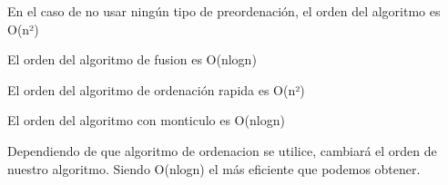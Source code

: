 En el caso de no usar ningún tipo de preordenación, el orden del algoritmo es O(n²)

El orden del algoritmo de fusion es O(nlogn)

El orden del algoritmo de ordenación rapida es O(n²)

El orden del algoritmo con monticulo es O(nlogn)

Dependiendo de que algoritmo de ordenacion se utilice, cambiará el orden de nuestro algoritmo. Siendo O(nlogn) el más eficiente que podemos obtener. 
